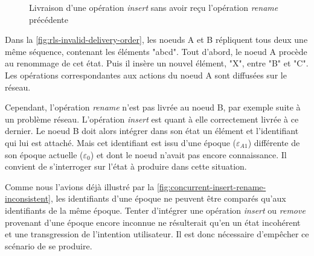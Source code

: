 \documentclass[12pt]{thesul}
\newcommand{\trm}[1]{\mathit{#1}}
\newcommand{\id}[3]{$\trm{#1}^{\trm{#2}}_{\trm{#3}}$}
\newcommand{\epoch}[1]{$\varepsilon_{#1}$}
\newcommand{\widthletter}{2em}
\begin{document}
\begin{figure}[!ht]
{
  }
  \caption{Livraison d'une opération \emph{insert} sans avoir reçu l'opération \emph{rename} précédente}
  \label{fig:rls-invalid-delivery-order}
\end{figure}

Dans la \autoref{fig:rls-invalid-delivery-order}, les noeuds A et B répliquent tous deux une même séquence, contenant les éléments "abcd".
Tout d'abord, le noeud A procède au renommage de cet état.
Puis il insère un nouvel élément, "X", entre "B" et "C".
Les opérations correspondantes aux actions du noeud A sont diffusées sur le réseau.

Cependant, l'opération \emph{rename} n'est pas livrée au noeud B, par exemple suite à un problème réseau.
L'opération \emph{insert} est quant à elle correctement livrée à ce dernier.
Le noeud B doit alors intégrer dans son état un élément et l'identifiant qui lui est attaché.
Mais cet identifiant est issu d'une époque (\epoch{A1}) différente de son époque actuelle (\epoch{0}) et dont le noeud n'avait pas encore connaissance.
Il convient de s'interroger sur l'état à produire dans cette situation.

Comme nous l'avions déjà illustré par la \autoref{fig:concurrent-insert-rename-inconsistent}, les identifiants d'une époque ne peuvent être comparés qu'aux identifiants de la même époque.
Tenter d'intégrer une opération \emph{insert} ou \emph{remove} provenant d'une époque encore inconnue ne résulterait qu'en un état incohérent et une transgression de l'intention utilisateur.
Il est donc nécessaire d'empêcher ce scénario de se produire.
\end{document}
